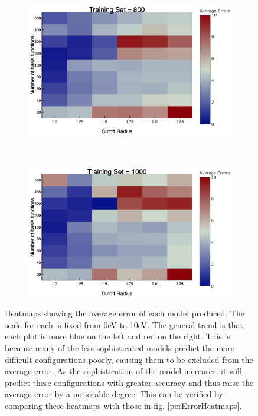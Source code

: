 \begin{figure}
\begin{subfigure}{0.5\textwidth}
    \caption{} 
    \label{aveErrors6}
  \end{subfigure}%
    \hspace*{\fill}   %
  \begin{subfigure}{0.5\textwidth}
    \includegraphics[width=\linewidth]{Figures/aveErrors8}
    \caption{} 
    \label{aveErrors8}
  \end{subfigure}%
    \\
  \begin{subfigure}{0.5\textwidth}
    \includegraphics[width=\linewidth]{Figures/aveErrors10}
    \caption{} 
    \label{aveErrors10}
  \end{subfigure}%
\caption{Heatmaps showing the average error of each model produced. The scale for each is fixed from 0eV to 10eV. The general trend is that each plot is more blue on the left and red on the right. This is because many of the less sophisticated models predict the more difficult configurations poorly, causing them to be excluded from the average error. As the sophistication of the model increases, it will predict these configurations with greater accuracy and thus raise the average error by a noticeable degree. This can be verified by comparing these heatmaps with those in fig. \ref{perErrorHeatmaps}.
\label{aveErrorHeatmaps}}
\end{figure}



